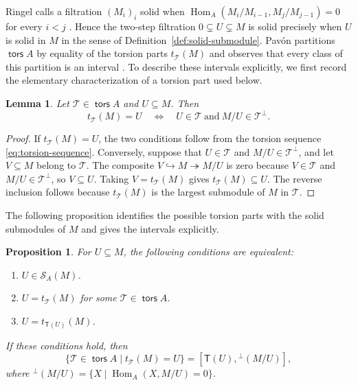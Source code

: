 \documentclass[a4paper,reqno,10pt]{amsart}
\newtheorem{proposition}[theorem]{Proposition}
\newtheorem{lemma}[theorem]{Lemma}
\theoremstyle{definition}
\numberwithin{equation}{section}
\newcommand{\Hom}{\operatorname{Hom}}
\DeclareMathOperator{\tors}{\mathsf{tors}}
\newcommand{\T}{\mathcal T}
\newcommand{\Tgen}{\mathsf T}
\newcommand{\Sol}{\mathcal S}
\begin{document}
Ringel calls a filtration $(M_i)_i$ solid when
$\Hom_A(M_i/M_{i-1},M_j/M_{j-1})=0$ for every $i<j$
\cite[Section~10.1]{RingelFiltrations}. Hence the two-step filtration
$0\subsetneq U\subsetneq M$ is solid precisely when $U$ is solid in $M$
in the sense of Definition~\ref{def:solid-submodule}.
Pav\'on partitions $\tors A$ by equality of the torsion parts
$t_\T(M)$ and observes that every class of this partition is an interval
\cite[Section~1.3]{Pavon}. To describe these intervals explicitly, we
first record the elementary characterization of a torsion part used below.

\begin{lemma}\label{lem:torsion-part-characterization}
Let $\T\in\tors A$ and $U\subseteq M$. Then
\[
 t_\T(M)=U\quad\Longleftrightarrow\quad
 U\in\T\ \text{and}\ M/U\in\T^\perp.
\]
\end{lemma}

\begin{proof}
If $t_\T(M)=U$, the two conditions follow from the torsion sequence
\eqref{eq:torsion-sequence}. Conversely, suppose that $U\in\T$ and
$M/U\in\T^\perp$, and let $V\subseteq M$ belong to $\T$. The composite
$V\hookrightarrow M\twoheadrightarrow M/U$ is zero because
$V\in\T$ and $M/U\in\T^\perp$, so $V\subseteq U$.
Taking $V=t_\T(M)$ gives $t_\T(M)\subseteq U$. The reverse inclusion
follows because $t_\T(M)$ is the largest submodule of $M$ in $\T$.
\end{proof}

The following proposition identifies the possible torsion parts with
the solid submodules of $M$ and gives the intervals explicitly.

\begin{proposition}\label{prop:torsion-parts}
For $U\subseteq M$, the following conditions are equivalent:
\begin{enumerate}
\item $U\in\Sol_A(M)$.
\item $U=t_{\T}(M)$ for some $\T\in\tors A$.
\item $U=t_{\Tgen(U)}(M)$.
\end{enumerate}
If these conditions hold, then
\begin{equation}\label{eq:interval}
 \{\T\in\tors A\mid t_{\T}(M)=U\}
   =[\Tgen(U),{}^\perp(M/U)],
\end{equation}
where ${}^\perp(M/U)=\{X\mid\Hom_A(X,M/U)=0\}$.
\end{proposition}
\end{document}
